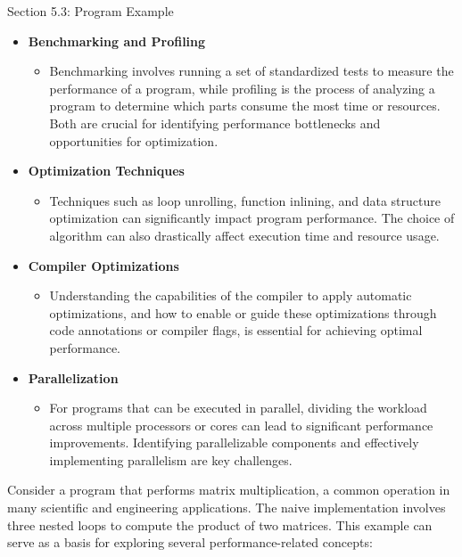 \begin{notes}{Section 5.3: Program Example}
    \begin{itemize}
        \item \textbf{Benchmarking and Profiling}
        \begin{itemize}
            \item Benchmarking involves running a set of standardized tests to measure the performance of a program, while profiling is the process of analyzing a program to determine which parts 
            consume the most time or resources. Both are crucial for identifying performance bottlenecks and opportunities for optimization.
        \end{itemize}
        \item \textbf{Optimization Techniques}
        \begin{itemize}
            \item Techniques such as loop unrolling, function inlining, and data structure optimization can significantly impact program performance. The choice of algorithm can also drastically 
            affect execution time and resource usage.
        \end{itemize}
        \item \textbf{Compiler Optimizations}
        \begin{itemize}
            \item Understanding the capabilities of the compiler to apply automatic optimizations, and how to enable or guide these optimizations through code annotations or compiler flags, is 
            essential for achieving optimal performance.
        \end{itemize}
        \item \textbf{Parallelization}
        \begin{itemize}
            \item For programs that can be executed in parallel, dividing the workload across multiple processors or cores can lead to significant performance improvements. Identifying parallelizable 
            components and effectively implementing parallelism are key challenges.
        \end{itemize}
    \end{itemize}
    
    \begin{highlight}
        Consider a program that performs matrix multiplication, a common operation in many scientific and engineering applications. The naive implementation involves three nested loops to compute 
        the product of two matrices. This example can serve as a basis for exploring several performance-related concepts:


\end{highlight}
\end{notes}
